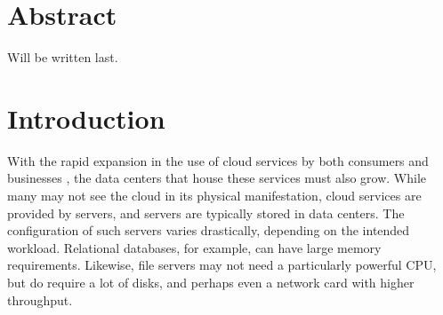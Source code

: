\documentclass[11pt]{article}
\begin{document}
\newpage



    
    






\section*{Abstract}
Will be written last.

\section{Introduction} \label{sec:introduction}
With the rapid expansion in the use of cloud services by both consumers and businesses \cite{Kushida2015}\cite{mokhtar2013}, the data centers that house these services must also grow. 
While many may not see the cloud in its physical manifestation, cloud services are provided by servers, and servers are typically stored in data centers. 
The configuration of such servers varies drastically, depending on the intended workload. 
Relational databases, for example, can have large memory requirements. 
Likewise, file servers may not need a particularly powerful CPU, but do require a lot of disks, and perhaps even a network card with higher throughput.
\end{document}
